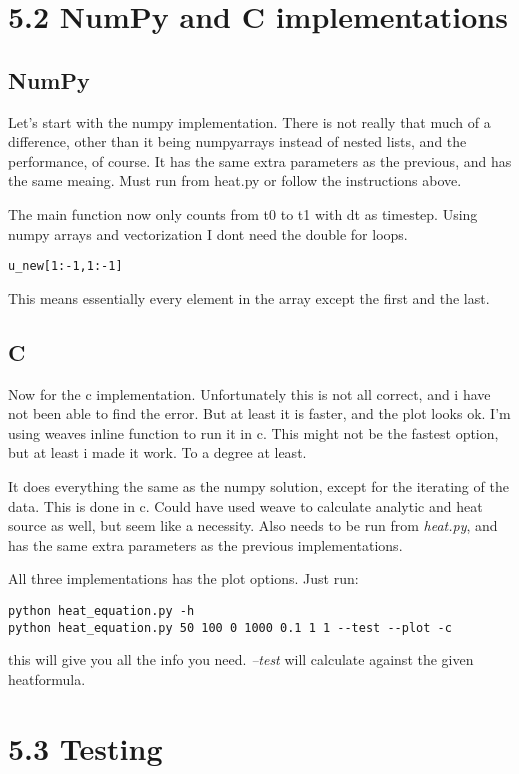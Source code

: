 \documentclass[a4paper]{article}
\begin{document}
\section*{5.2 NumPy and C implementations }

\subsection*{NumPy}
Let's start with the numpy implementation. There is not really that much of a difference, other than it being numpyarrays instead of nested lists, and the performance, of course. It has the same extra parameters as the previous, and has the same meaing. Must run from heat\textunderscoreequation\textunderscoreui.py or follow the instructions above. 

The main function now only counts from t0 to t1 with dt as timestep. Using numpy arrays and vectorization I dont need the double for loops. 
\begin{verbatim}
u_new[1:-1,1:-1] 
\end{verbatim}
This means essentially every element in the array except the first and the last. 

\subsection*{C}
Now for the c implementation. Unfortunately this is not all correct, and i have not been able to find the error. But at least it is faster, and the plot looks ok. I'm using weaves inline function to run it in c. This might not be the fastest option, but at least i made it work. To a degree at least. 

It does everything the same as the numpy solution, except for the iterating of the data. This is done in c. Could have used weave to calculate analytic and heat source as well, but seem like a necessity. Also needs to be run from \emph{heat\textunderscoreequation.py}, and has the same extra parameters as the previous implementations.

All three implementations has the plot options. Just run:
\begin{verbatim}
python heat_equation.py -h
python heat_equation.py 50 100 0 1000 0.1 1 1 --test --plot -c
\end{verbatim}
this will give you all the info you need. \emph{--test} will calculate against the given heat\textunderscoresource formula. 
\section*{5.3 Testing}
\end{document}

